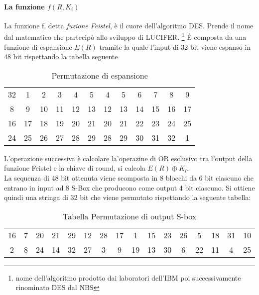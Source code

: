 \documentclass[11pt, a4paper, oneside]{Thesis} %
\begin{document}
\paragraph{La funzione $f(R, K_i)$}La funzione f, detta \emph{fuzione Feistel}, è il cuore dell'algoritmo DES. Prende il nome dal matematico che partecipò allo sviluppo di LUCIFER.
\footnote{nome dell'algoritmo prodotto dai laboratori dell'IBM poi successivamente rinominato DES dal NBS}
\'E composta da una funzione di espansione $E(R)$ tramite la quale l'input di 32 bit viene espanso in 48 bit rispettando la tabella seguente
  \begin{table}[ht] 
  \caption{Permutazione di espansione} %
  \centering %
  \begin{tabular}{c c c c c c c c c c c c} %
  \hline %
  32 & 1 & 2 & 3 & 4 & 5 & 4 & 5 & 6 & 7 & 8 & 9\\
  8 & 9 & 10 & 11 & 12 & 13 & 12 & 13 & 14 & 15 & 16 & 17\\
  16 & 17 & 18 & 19 & 20 & 21 & 20 & 21 & 22 & 23 & 24 & 25\\
  24 & 25 & 26 & 27 & 28 & 29 & 28 & 29 & 30 & 31 & 32 & 1\\
  \hline %
  \end{tabular} 
  \label{table:tabExpR} %
  \end{table}
L'operazione successiva è calcolare la'operazine di OR esclusivo tra l'output della funzione Feistel e la chiave di round, si calcola $E(R) \oplus K_i$.
\\La sequenza di 48 bit ottenuta viene scomposta in 8 blocchi da 6 bit ciascuno che entrano in input ad 8 S-Box che producono come output 4 bit ciascuno. Si ottiene quindi una stringa di 
32 bit che viene permutato rispettando la seguente tabella:
  \begin{table}[ht] 
    \caption{Tabella Permutazione di output S-box} %
    \centering %
      \begin{tabular}{c c c c c c c c c c c c c c c c} %
      \hline %
	16 & 7 & 20 & 21 & 29 & 12 & 28 & 17 &  1 & 15 & 23 & 26 &  5 & 18 & 31 & 10\\
	2 & 8 & 24 & 14 & 32 & 27 &  3 &  9 & 19 & 13 & 30 &  6 & 22 & 11 &  4 & 25\\
      \hline %
      \end{tabular} 
    \label{table:permOutputSbox} %
  \end{table}
\end{document}

